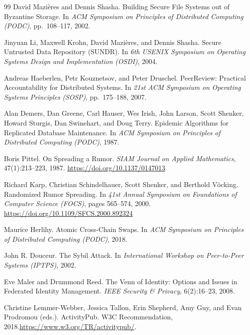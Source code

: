 \documentclass[11pt,a4paper]{article}
\theoremstyle{definition}
\theoremstyle{remark}
\begin{document}
\begin{thebibliography}{99}
David Mazi\`eres and Dennis Shasha.
\newblock Building Secure File Systems out of Byzantine Storage.
\newblock In \textit{ACM Symposium on Principles of Distributed Computing (PODC)}, pp.~108--117, 2002.

Jinyuan Li, Maxwell Krohn, David Mazi\`eres, and Dennis Shasha.
\newblock Secure Untrusted Data Repository (SUNDR).
\newblock In \textit{6th USENIX Symposium on Operating Systems Design and Implementation (OSDI)}, 2004.

Andreas Haeberlen, Petr Kouznetsov, and Peter Druschel.
\newblock PeerReview: Practical Accountability for Distributed Systems.
\newblock In \textit{21st ACM Symposium on Operating Systems Principles (SOSP)}, pp.~175--188, 2007.

Alan Demers, Dan Greene, Carl Hauser, Wes Irish, John Larson, Scott Shenker, Howard Sturgis, Dan Swinehart, and Doug Terry.
\newblock Epidemic Algorithms for Replicated Database Maintenance.
\newblock In \textit{ACM Symposium on Principles of Distributed Computing (PODC)}, 1987.

Boris Pittel.
\newblock On Spreading a Rumor.
\newblock \textit{SIAM Journal on Applied Mathematics}, 47(1):213--223, 1987.
\newblock \url{https://doi.org/10.1137/0147013}

Richard Karp, Christian Schindelhauer, Scott Shenker, and Berthold V\"ocking.
\newblock Randomized Rumor Spreading.
\newblock In \textit{41st Annual Symposium on Foundations of Computer Science (FOCS)}, pages 565--574, 2000.
\newblock \url{https://doi.org/10.1109/SFCS.2000.892324}

Maurice Herlihy.
\newblock Atomic Cross-Chain Swaps.
\newblock In \textit{ACM Symposium on Principles of Distributed Computing (PODC)}, 2018.

John R. Douceur.
\newblock The Sybil Attack.
\newblock In \textit{International Workshop on Peer-to-Peer Systems (IPTPS)}, 2002.

Eve Maler and Drummond Reed.
\newblock The Venn of Identity: Options and Issues in Federated Identity Management.
\newblock \textit{IEEE Security \& Privacy}, 6(2):16--23, 2008.

Christine Lemmer-Webber, Jessica Tallon, Erin Shepherd, Amy Guy, and Evan Prodromou (eds.).
\newblock ActivityPub.
\newblock W3C Recommendation, 2018.\newblock \url{https://www.w3.org/TR/activitypub/}.


\end{thebibliography}
\end{document}
